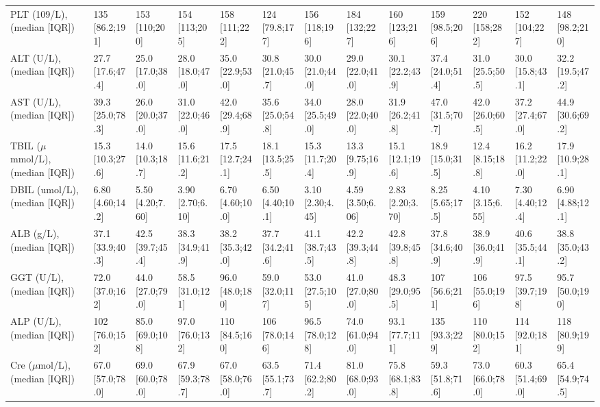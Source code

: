 \begin{landscape}
\begin{center}
\begin{longtable}{p{6.0cm}p{3.0cm}p{3.0cm}p{3.0cm}p{3.0cm}p{3.0cm}p{3.0cm}p{3.0cm}p{3.0cm}p{3.0cm}p{3.0cm}p{3.0cm}p{3.0cm}}
PLT (109/L), (median [IQR]) &  135 [86.2;191]  &  153 [110;200]   &  154 [113;205]   &  158 [111;222]   &  124 [79.8;177]  &  156 [118;196]   &  184 [132;227]   &  160 [123;216]   &  159 [98.5;206]  &  220 [158;282]   &  152 [104;227]   &  148 [98.2;210]  \\
ALT (U/L), (median [IQR]) & 27.7 [17.6;47.4] & 25.0 [17.0;38.0] & 28.0 [18.0;47.0] & 35.0 [22.9;53.0] & 30.8 [21.0;45.7] & 30.0 [21.0;44.0] & 29.0 [22.0;41.0] & 30.1 [22.2;43.9] & 37.4 [24.0;51.4] & 31.0 [25.5;50.5] & 30.0 [15.8;43.1] & 32.2 [19.5;47.2] \\
AST (U/L), (median [IQR]) & 39.3 [25.0;78.3] & 26.0 [20.0;37.0] & 31.0 [22.0;46.0] & 42.0 [29.4;68.9] & 35.6 [25.0;54.8] & 34.0 [25.5;49.0] & 28.0 [22.0;40.0] & 31.9 [26.2;41.8] & 47.0 [31.5;70.7] & 42.0 [26.0;60.5] & 37.2 [27.4;67.0] & 44.9 [30.6;69.2] \\
TBIL ($\mu$mmol/L), (median [IQR]) & 15.3 [10.3;27.6] & 14.0 [10.3;18.7] & 15.6 [11.6;21.2] & 17.5 [12.7;24.1] & 18.1 [13.5;25.5] & 15.3 [11.7;20.4] & 13.3 [9.75;16.9] & 15.1 [12.1;19.6] & 18.9 [15.0;31.5] & 12.4 [8.15;18.8] & 16.2 [11.2;22.0] & 17.9 [10.9;28.1] \\
DBIL (umol/L), (median [IQR]) & 6.80 [4.60;14.2] & 5.50 [4.20;7.60] & 3.90 [2.70;6.10] & 6.70 [4.60;10.0] & 6.50 [4.40;10.1] & 3.10 [2.30;4.45] & 4.59 [3.50;6.06] & 2.83 [2.20;3.70] & 8.25 [5.65;17.5] & 4.10 [3.15;6.55] & 7.30 [4.40;12.4] & 6.90 [4.88;12.1] \\
ALB (g/L), (median [IQR]) & 37.1 [33.9;40.3] & 42.5 [39.7;45.4] & 38.3 [34.9;41.9] & 38.2 [35.3;42.0] & 37.7 [34.2;41.6] & 41.1 [38.7;43.5] & 42.2 [39.3;44.8] & 42.8 [39.8;45.8] & 37.8 [34.6;40.9] & 38.9 [36.0;41.9] & 40.6 [35.5;44.1] & 38.8 [35.0;43.2] \\
GGT (U/L), (median [IQR]) & 72.0 [37.0;162]  & 44.0 [27.0;79.0] & 58.5 [31.0;121]  & 96.0 [48.0;180]  & 59.0 [32.0;117]  & 53.0 [27.5;105]  & 41.0 [27.0;80.0] & 48.3 [29.0;95.5] &  107 [56.6;211]  &  106 [55.0;196]  & 97.5 [39.7;198]  & 95.7 [50.0;190]  \\
ALP (U/L), (median [IQR]) &  102 [76.0;152]  & 85.0 [69.0;108]  & 97.0 [76.0;132]  &  110 [84.5;160]  &  106 [78.0;146]  & 96.5 [78.0;128]  & 74.0 [61.0;94.0] & 93.1 [77.7;111]  &  135 [93.3;229]  &  110 [80.0;152]  &  114 [92.0;181]  &  118 [80.9;199]  \\
Cre ($\mu$mol/L), (median [IQR]) & 67.0 [57.0;78.0] & 69.0 [60.0;78.0] & 67.9 [59.3;78.7] & 67.0 [58.0;76.0] & 63.5 [55.1;73.7] & 71.4 [62.2;80.2] & 81.0 [68.0;93.0] & 75.8 [68.1;83.8] & 59.3 [51.8;71.6] & 73.0 [66.0;78.0] & 60.3 [51.4;69.0] & 65.4 [54.9;74.5] \\

\end{longtable}
\end{center}
\end{landscape}
